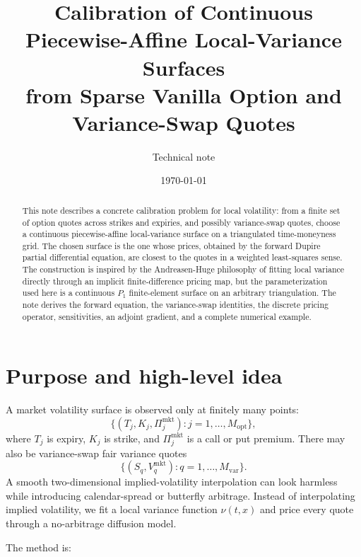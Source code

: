 \documentclass[11pt]{article}
\title{\Large Calibration of Continuous Piecewise-Affine Local-Variance Surfaces\\[2mm]
\large from Sparse Vanilla Option and Variance-Swap Quotes}
\author{Technical note}
\date{\today}
\newcommand{\1}{\mathbf{1}}
\newcommand{\vloc}{\nu}
\begin{document}
\maketitle

\begin{abstract}
This note describes a concrete calibration problem for local volatility: from a finite set
of option quotes across strikes and expiries, and possibly variance-swap quotes, choose a
continuous piecewise-affine local-variance surface on a triangulated time-moneyness grid.
The chosen surface is the one whose prices, obtained by the forward Dupire partial
differential equation, are closest to the quotes in a weighted least-squares sense. The
construction is inspired by the Andreasen-Huge philosophy of fitting local variance
directly through an implicit finite-difference pricing map, but the parameterization used
here is a continuous $P_1$ finite-element surface on an arbitrary triangulation.
The note derives the forward equation, the variance-swap identities, the discrete pricing
operator, sensitivities, an adjoint gradient, and a complete numerical example.
\end{abstract}

\tableofcontents

\section{Purpose and high-level idea}

A market volatility surface is observed only at finitely many points:
\[
  \{(T_j,K_j,\Pi_j^{\mathrm{mkt}}):j=1,\ldots,M_{\mathrm{opt}}\},
\]
where $T_j$ is expiry, $K_j$ is strike, and $\Pi_j^{\mathrm{mkt}}$ is a call or put
premium. There may also be variance-swap fair variance quotes
\[
  \{(S_q,V_q^{\mathrm{mkt}}):q=1,\ldots,M_{\mathrm{var}}\}.
\]
A smooth two-dimensional implied-volatility interpolation can look harmless while
introducing calendar-spread or butterfly arbitrage. Instead of interpolating implied
volatility, we fit a local variance function $\vloc(t,x)$ and price every quote through
a no-arbitrage diffusion model.

The method is:
\end{document}
